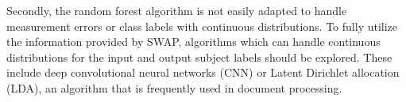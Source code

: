 \documentclass[twocolumn]{aastex6}
\newcommand{\feat}{`Featured'}
\newcommand{\notfeat}{`Not'}
\begin{document}

Secondly, the random forest algorithm is not easily adapted to handle measurement 
errors or class labels with continuous distributions. To fully utilize the information provided by
SWAP, algorithms which can handle continuous distributions for the input and output 
subject labels should be explored. 
These include deep convolutional neural networks (CNN) or Latent Dirichlet allocation (LDA), 
an algorithm that is frequently used in document processing. 


\end{document}
